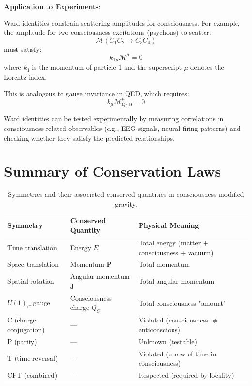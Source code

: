 \begin{level2}
\textbf{Application to Experiments}:

Ward identities constrain scattering amplitudes for consciousness. For example, the amplitude for two consciousness excitations (psychons) to scatter:
\begin{equation}
\mathcal{M}(C_1 C_2 \to C_3 C_4)
\end{equation}
must satisfy:
\begin{equation}
k_{1\mu} \mathcal{M}^\mu = 0
\end{equation}
where $k_1$ is the momentum of particle 1 and the superscript $\mu$ denotes the Lorentz index.

This is analogous to gauge invariance in QED, which requires:
\begin{equation}
k_\mu \mathcal{M}^\mu_{\text{QED}} = 0
\end{equation}

Ward identities can be tested experimentally by measuring correlations in consciousness-related observables (e.g., EEG signals, neural firing patterns) and checking whether they satisfy the predicted relationships.
\end{level2}

\section{Summary of Conservation Laws}

\begin{table}[h]
\centering
\begin{tabular}{@{} l l l @{}}
\toprule
\textbf{Symmetry} & \textbf{Conserved Quantity} & \textbf{Physical Meaning} \\
\midrule
Time translation & Energy $E$ & Total energy (matter + consciousness + vacuum) \\
Space translation & Momentum $\mathbf{P}$ & Total momentum \\
Spatial rotation & Angular momentum $\mathbf{J}$ & Total angular momentum \\
$U(1)_C$ gauge & Consciousness charge $Q_C$ & Total consciousness "amount" \\
\midrule
C (charge conjugation) & --- & Violated (consciousness $\neq$ anticonscious) \\
P (parity) & --- & Unknown (testable) \\
T (time reversal) & --- & Violated (arrow of time in consciousness) \\
CPT (combined) & --- & Respected (required by locality) \\
\bottomrule
\end{tabular}
\caption{Symmetries and their associated conserved quantities in consciousness-modified gravity.}
\label{tab:symmetries-summary}
\end{table}

